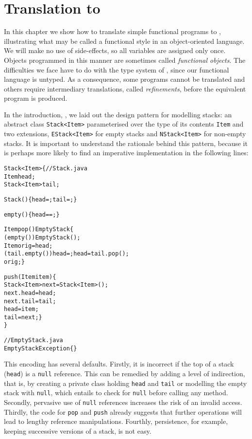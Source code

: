 \chapter{Translation to \Java}

In this chapter we show how to translate simple functional programs to
\Java, illustrating what may be called a functional style in an
object\hyp{}oriented language. We will make no use of
side\hyp{}effects, so all variables are assigned only once. Objects
programmed in this manner are sometimes called \emph{functional
  objects}. The difficulties we face have to do with the type system
of \Java, since our functional language is untyped. As a consequence,
some programs cannot be translated and others require intermediary
translations, called \emph{refinements}, before the equivalent \Java
program is produced.

In the introduction, , we laid out the design
pattern for modelling stacks: an abstract class \texttt{Stack<Item>}
parameterised over the type of its contents \texttt{Item} and two
extensions, \texttt{EStack<Item>} for empty stacks and
\texttt{NStack<Item>} for non\hyp{}empty stacks. It is important to
understand the rationale behind this pattern, because it is perhaps
more likely to find an imperative implementation in the following
lines:
\begin{alltt}
\public \class Stack<Item> \{\hfill// Stack.java
  \private Item head;
  \private Stack<Item> tail;

  \public Stack() \{ head = \nullX; tail = \nullX; \}

  \public \booleanX empty() \{ \return head == \nullX; \}

  \public Item pop() \throws EmptyStack \{
    \ifX (empty()) \throw \new EmptyStack();
    \final Item orig = head;
    \ifX (tail.empty()) head = \nullX; \elseX head = tail.pop();
    \return orig; \}

  \public \void push(\final Item item) \{
    Stack<Item> next = \new Stack<Item>();
    next.head = head;
    next.tail = tail;
    head = item;
    tail = next; \}
\}

// EmptyStack.java
\public \class EmptyStack \extends Exception \{\}
\end{alltt}
This encoding has several defaults. Firstly, it is incorrect if the
top of a stack (\texttt{head}) is a \texttt{null} reference. This can
be remedied by adding a level of indirection, that is, by creating a
private class holding \texttt{head} and \texttt{tail} or modelling the
empty stack with \texttt{null}, which entails to check for
\texttt{null} before calling any method. Secondly, pervasive use of
\texttt{null} references increases the risk of an invalid
access. Thirdly, the code for \texttt{pop} and \texttt{push} already
suggests that further operations will lead to lengthy reference
manipulations. Fourthly, persistence, for example, keeping successive
versions of a stack, is not easy.


